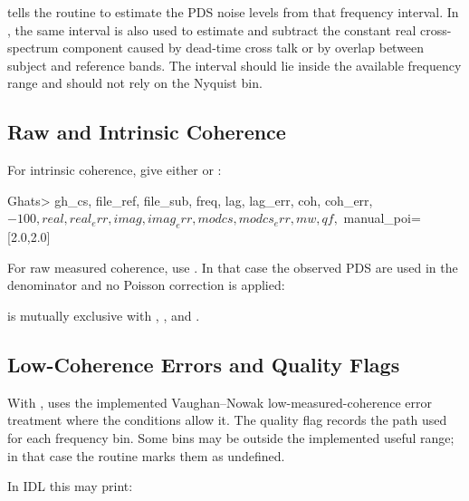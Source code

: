  tells the routine to estimate the PDS noise
levels from that frequency interval.  In , the same interval
is also used to estimate and subtract the constant real cross-spectrum
component caused by dead-time cross talk or by overlap between subject and
reference bands.  The interval should lie inside the available frequency
range and should not rely on the Nyquist bin.

\subsection*{Raw and Intrinsic Coherence}

For intrinsic coherence, give either  or
:

\begin{ghatsconsole}
Ghats> gh_cs, file_ref, file_sub, freq, lag, lag_err, coh, coh_err, $
       -100, real, real_err, imag, imag_err, modcs, modcs_err, mw, qf, $
       manual_poi=[2.0,2.0]
\end{ghatsconsole}

For raw measured coherence, use .  In that case the observed
PDS are used in the denominator and no Poisson correction is applied:


 is mutually exclusive with ,
, and .

\subsection*{Low-Coherence Errors and Quality Flags}

With ,  uses the implemented
Vaughan--Nowak low-measured-coherence error treatment where the conditions
allow it.  The quality flag  records the path used for each
frequency bin.  Some bins may be outside the implemented useful range; in
that case the routine marks them as undefined.

In IDL this may print:

\begin{ghatsconsole}
\end{ghatsconsole}

